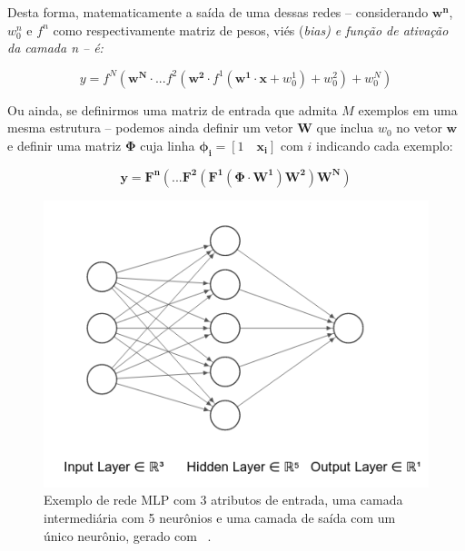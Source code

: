 \documentclass[a0,portrait]{a0poster}
\begin{document}
\begin{multicols}{2}
    Desta forma, matematicamente a saída de uma dessas redes -- considerando $\mathbf{w^n}$, $w_0^n$ e $f^n$ como respectivamente matriz de pesos, viés (\em bias\em ) e função de ativação da camada n --  é:

    \begin{equation}
  y = f^N(\mathbf{w^N}\cdot ... f^2(\mathbf{w^2}\cdot f^1(\mathbf{w^1} \cdot \mathbf{x} + w_0^1) + w_0^2) + w_0^N)
    \end{equation}


    Ou ainda, se definirmos uma matriz de entrada que admita $M$ exemplos em uma mesma estrutura -- podemos ainda definir um vetor $\mathbf{W}$ que inclua $w_0$ no vetor $\mathbf{w}$ e definir uma matriz $\mathbf{\Phi}$ cuja linha $\mathbf{\phi_{i}} = [1 \quad \mathbf{x_i}]$ com $i$ indicando cada exemplo:

\begin{equation}
    \label{eq:mlp}
  \mathbf{y} = \mathbf{F^n}( ... \mathbf{F^2}(\mathbf{F^1}(\boldsymbol{\Phi} \cdot \mathbf{W^1})\mathbf{W^2})\mathbf{W^N})
\end{equation}


  \begin{figure}[H]
        {\centering
        \includegraphics[width=.45\linewidth]{mlp_ex.png}
        \caption{Exemplo de rede MLP com 3 atributos de entrada, uma camada intermediária com 5 neurônios e uma camada de saída com um único neurônio, gerado com ~\cite{nnsvg}.}
        \label{fig:mlp}\par}
  \end{figure}


\end{multicols}
\end{document}
